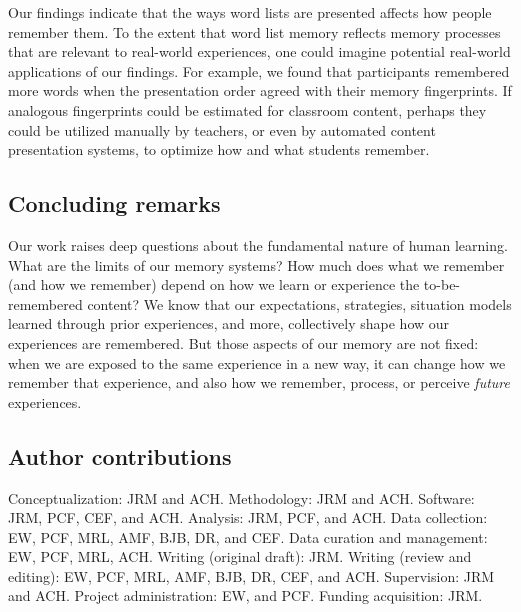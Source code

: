 \documentclass[11pt]{article}
\begin{document}
Our findings indicate that the ways word lists are presented affects how people
remember them. To the extent that word list memory reflects memory processes
that are relevant to real-world experiences, one could imagine potential
real-world applications of our findings. For example, we found that
participants remembered more words when the presentation order agreed with
their memory fingerprints. If analogous fingerprints could be estimated for
classroom content, perhaps they could be utilized manually by teachers, or even
by automated content presentation systems, to optimize how and what students
remember.



\subsection*{Concluding remarks}

Our work raises deep questions about the fundamental nature of human learning.
What are the limits of our memory systems? How much does what we remember (and
how we remember) depend on how we learn or experience the to-be-remembered
content? We know that our expectations, strategies, situation models learned
through prior experiences, and more, collectively shape how our experiences are
remembered. But those aspects of our memory are not fixed: when we are exposed
to the same experience in a new way, it can change how we remember
that experience, and also how we remember, process, or perceive
\textit{future} experiences.

\subsection*{Author contributions}

Conceptualization: JRM and ACH. Methodology: JRM and ACH. Software: JRM, PCF,
CEF, and ACH. Analysis: JRM, PCF, and ACH. Data collection: EW, PCF, MRL, AMF,
BJB, DR, and CEF. Data curation and management: EW, PCF, MRL, ACH. Writing
(original draft): JRM. Writing (review and editing): EW, PCF, MRL, AMF, BJB,
DR, CEF, and ACH. Supervision: JRM and ACH. Project administration: EW, and
PCF. Funding acquisition: JRM.
\end{document}
